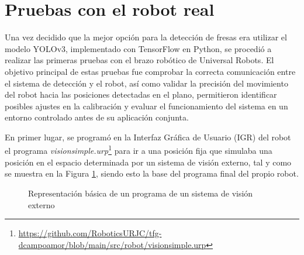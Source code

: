 \section{Pruebas con el robot real}
\label{Pruebas_UR}

Una vez decidido que la mejor opción para la detección de fresas era utilizar el modelo YOLOv3, implementado con TensorFlow en Python, se procedió a realizar las primeras pruebas con el brazo robótico de Universal Robots. El objetivo principal de estas pruebas fue comprobar la correcta comunicación entre el sistema de detección y el robot, así como validar la precisión del movimiento del robot hacia las posiciones detectadas en el plano, permitieron identificar posibles ajustes en la calibración y evaluar el funcionamiento del sistema en un entorno controlado antes de su aplicación conjunta.

En primer lugar, se programó en la Interfaz Gráfica de Usuario (IGR) del robot el programa \textit{visionsimple.urp}\footnote{\url{https://github.com/RoboticsURJC/tfg-dcampoamor/blob/main/src/robot/visionsimple.urp}} para ir a una posición fija que simulaba una posición en el espacio determinada por un sistema de visión externo, tal y como se muestra en la Figura \ref{fig:visionsimple}, siendo esto la base del programa final del propio robot.

   \begin{figure}[H]
      \begin{center}
        \subcapcentertrue
        \hspace{1mm}
      \end{center}
      \caption{Representación básica de un programa de un sistema de visión externo}
      \label{fig:visionsimple}
    \end{figure}

